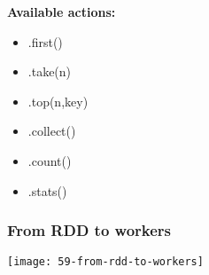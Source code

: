 \textbf{Available actions:}
\begin{itemize}
	\item .first()
	\item .take(n)
	\item .top(n,key)
	\item .collect()
	\item .count()
	\item .stats()
\end{itemize}

\subsubsection{From RDD to workers}

\begin{center}
  \texttt{[image: 59-from-rdd-to-workers]}
\end{center}

